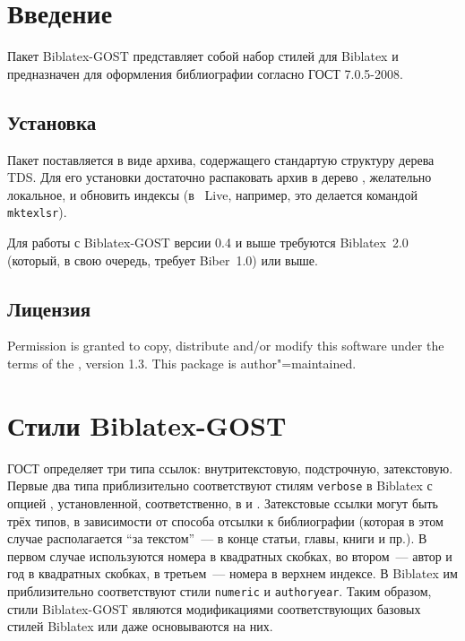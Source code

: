 \documentclass[10pt,a4paper,headings=small,numbers=enddot]{ltxdockit}[2011/03/25]
\newcommand*{\biber}{Biber\xspace}
\newcommand*{\biblatex}{Biblatex\xspace}
\newcommand*{\biblatexgost}{\biblatex-GOST\xspace}
\providecommand*{\printtitlepage}{}
\newcommand*{\bibsty}{\texttt}
\newcommand*{\gostname}{ГОСТ 7.0.5-2008}
\begin{document}
\printtitlepage
\tableofcontents
\listoftables

\section{Введение}
\label{sec:int}

Пакет \biblatexgost{} представляет 
собой набор стилей для \biblatex{} 
и предназначен для оформления библиографии согласно \gostname. 

\subsection{Установка}
\label{sec:install}

Пакет поставляется в виде архива, содержащего стандартую структуру дерева TDS. 
Для его установки достаточно распаковать архив в дерево \tex, желательно локальное, и 
обновить индексы (в \tex~Live, например, это делается командой \texttt{mktexlsr}).

Для работы с \biblatexgost версии 0.4 и выше требуются 
\biblatex~2.0 (который,
в свою очередь, требует \biber~1.0) или выше.

\subsection{Лицензия}
\label{sec:lic}

Permission is granted to copy, distribute and\slash or modify this software under the terms of the \lppl, version 1.3. This package is author"=maintained.


\section{Стили \biblatexgost}
\label{sec:styles}

ГОСТ определяет три типа ссылок: внутритекстовую, подстрочную, затекстовую.
Первые два типа приблизительно соответствуют стилям \bibsty{verbose} в \biblatex 
с опцией , установленной, соответственно, в  и 
. Затекстовые ссылки могут быть трёх типов, в зависимости 
от способа отсылки к библиографии (которая в этом случае располагается 
\enquote{за текстом}~--- в конце статьи, главы, книги и пр.). 
В первом случае используются номера в квадратных скобках, во 
втором~--- автор и год в квадратных скобках, в третьем~--- номера в верхнем индексе. 
В \biblatex им приблизительно 
соответствуют стили \bibsty{numeric} и \bibsty{authoryear}. Таким образом, 
стили \biblatexgost являются модификациями соответствующих базовых стилей 
\biblatex или даже основываются на них. 
\end{document}
